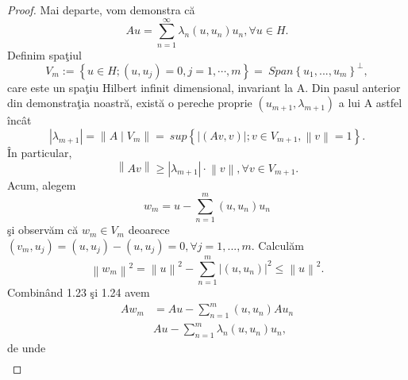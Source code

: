 \documentclass[a4paper,12pt,oneside]{report}
\begin{document}
\begin{proof}
\noindent Mai departe, vom demonstra c\u{a}
\begin{displaymath}
  Au = \sum_{n=1}^{\infty }\lambda _{n}\left ( u,u_{n} \right )u_{n}, \forall u \in H . \label{eq:1.22} \tag{1.22}
\end{displaymath}
Definim spa\c{t}iul
\begin{displaymath}
   V_{m}:= \left \{ u \in H;\left ( u,u_{j} \right ) = 0, j = 1,\cdots,m \right \} = \ Span\left \{ u_{1},...,u_{m} \right \}^{\perp },
\end{displaymath}
care este un spa\c{t}iu Hilbert infinit dimensional, invariant la A. Din pasul anterior din demonstra\c{t}ia noastr\u{a}, exist\u{a} o pereche proprie \(\left ( u_{m+1}, \lambda _{m+1} \right )\) a lui A astfel \^{i}nc\^{a}t
\begin{displaymath}
  \left | \lambda _{m+1} \right | = \left \| A\mid V_{m} \right \| = \ sup \left \{ \left | \left ( Av,v \right ) \right |; v \in V_{m+1} , \left \| v \right \| = 1\right \}.
\end{displaymath}
\^{I}n particular,
\begin{displaymath}
  \left \| Av \right \| \geq  \left | \lambda _{m+1} \right | \cdot \left \| v \right \| , \forall v \in V_{m+1}. \label{eq:1.23} \tag{1.23}
\end{displaymath}
Acum, alegem
\begin{displaymath}
  w_{m}= u - \sum_{n=1}^{m}\left ( u,u_{n} \right )u_{n}
\end{displaymath}
\c{s}i observ\u{a}m c\u{a} \(w_{m} \in V_{m}\) deoarece \(\left ( v_{m} ,u_{j}\right ) = \left ( u,u_{j} \right ) - \left ( u,u_{j} \right ) = 0, \forall j = 1,...,m. \) Calcul\u{a}m
\begin{displaymath}
  \left \| w_{m} \right \|^{2} = \left \| u \right \|^{2} - \sum_{n=1}^{m}\left | \left ( u,u_{n} \right ) \right |^{2} \leq \left \| u \right \|^{2}. \label{eq:1.24} \tag{1.24}
\end{displaymath}
Combin\^{a}nd 1.23 \c{s}i 1.24 avem
\begin{equation} \nonumber
    \begin{split}
      Aw_{m} & = Au - \sum_{n=1}^{m}\left ( u,u_{n} \right )Au_{n}  \\ &  Au - \sum_{n=1}^{m}\lambda _{n}\left ( u,u_{n} \right )u_{n},
    \end{split}
\end{equation}
de unde
\begin{equation} \nonumber\label{eq:1.25} \tag{1.25}
    \begin{split}

\end{split}
\end{equation}
\end{proof}
\end{document}
